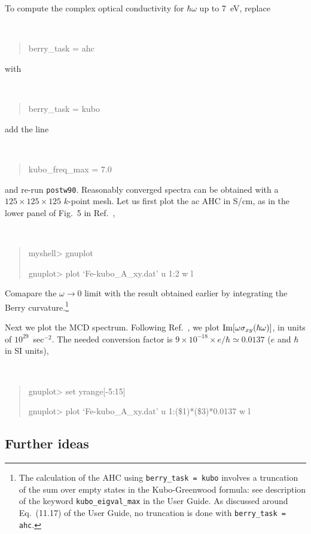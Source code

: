 \documentclass[a4paper,11pt,twoside]{article}
\begin{document}
To compute the complex optical conductivity for $\hbar\omega$
up to 7~eV, replace 
{\tt
\begin{quote}
berry\_task = ahc
\end{quote} }
%
with
%
{\tt
\begin{quote}
berry\_task = kubo
\end{quote} }
%
add the line
%
{\tt
\begin{quote}
kubo\_freq\_max = 7.0
\end{quote} }
%
and re-run {\tt postw90}. Reasonably converged spectra can be
obtained with a $125\times 125\times 125$ $k$-point mesh. Let us first
plot the ac AHC in S/cm, as in the lower panel of Fig.~5 in
Ref.~\cite{yao-prl04}, {\tt
\begin{quote}
myshell> gnuplot

gnuplot> plot `Fe-kubo\_A\_xy.dat' u 1:2 w l
\end{quote} }

Comapare the $\omega\rightarrow 0$ limit with the result obtained
earlier by integrating the Berry curvature.\footnote{The calculation
  of the AHC using {\tt berry\_task = kubo} involves a truncation of
  the sum over empty states in the Kubo-Greenwood formula: see
  description of the keyword {\tt kubo\_eigval\_max} in the User
  Guide. As discussed around Eq.~(11.17) of the User Guide, no
  truncation is done with {\tt berry\_task = ahc}.}


Next we plot the MCD spectrum. Following Ref.~\cite{yao-prl04}, we
plot ${\rm Im}[\omega\sigma_{xy}(\hbar\omega)]$, in units of
$10^{29}$~sec$^{-2}$. The needed conversion factor is $9\times
10^{-18}\times e/\hbar\simeq 0.0137$ ($e$ and $\hbar$ in SI units),
{\tt
\begin{quote}
gnuplot> set yrange[-5:15]

gnuplot> plot `Fe-kubo\_A\_xy.dat' u 1:(\$1)*(\$3)*0.0137 w l
\end{quote} }

\subsection*{Further ideas}
\end{document}
